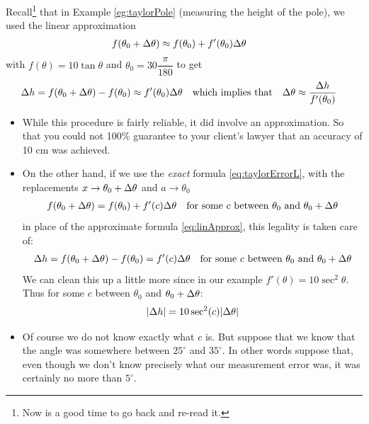 \begin{eg}[More on $e^x$]
\end{eg}

\begin{eg}\label{eg_3_4_6}
Recall\footnote{Now is a good time to go back and re-read it.} that in Example
\ref{eg:taylorPole} (measuring the height of the pole), we
used the linear approximation
\begin{align*}%
f(\theta_0+\De\theta)&\approx f(\theta_0)+f'(\theta_0)\De\theta
\end{align*}
with $f(\theta)=10\tan\theta$ and $\theta_0=30\dfrac{\pi}{180}$ to get
\begin{align*}
\Delta h &=f(\theta_0+\Delta\theta)-f(\theta_0)\approx f'(\theta_0)\Delta\theta
  & \text{which implies that} &
  &\Delta\theta &\approx \frac{\Delta h}{f'(\theta_0)}
\end{align*}
\begin{itemize}
\item While this procedure is fairly reliable, it did involve an approximation.
So that you could not 100\% guarantee to your client's lawyer  that an accuracy of 10 cm
was achieved.
\item On the other hand, if we use the \emph{exact} formula \eqref{eq:taylorErrorL}, with
the replacements
$x\rightarrow \theta_0+\Delta\theta$ and $a\rightarrow\theta_0$
\begin{align*}
f(\theta_0+\Delta\theta)&=f(\theta_0)+f'(c)\Delta\theta
& \text{for some $c$ between $\theta_0$ and $\theta_0+\Delta\theta$}
\end{align*}
in place of the approximate formula \eqref{eq:linApprox}, this legality
is taken care of:
\begin{align*}
\Delta h &=f(\theta_0+\Delta\theta)-f(\theta_0) =f'(c)\Delta\theta
& \text{for some $c$ between $\theta_0$ and $\theta_0+\Delta\theta$}
\end{align*}
We can clean this up a little more since in our example $f'(\theta) = 10\sec^2\theta$.
Thus for some $c$ between $\theta_0$ and $\theta_0 + \Delta\theta$:
\begin{align*}
|\Delta h| = 10 \sec^2(c) |\Delta \theta|
\end{align*}



\item Of course we do not know exactly what $c$ is. But suppose that we know
that the angle was somewhere between $25^\circ$ and $35^\circ$. In other
words suppose that, even though we don't know precisely
what our measurement error was, it was certainly no more than $5^\circ$.


\end{itemize}
\end{eg}
